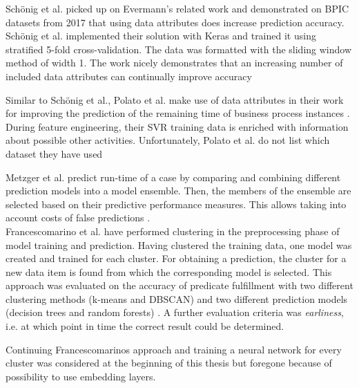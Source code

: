 Schönig et al. \cite{schoenig2018} picked up on Evermann's related work and demonstrated on BPIC datasets from 2017 that using data attributes does increase prediction accuracy. Schönig et al. implemented their solution with Keras and trained it using stratified 5-fold cross-validation. The data was formatted with the sliding window method of width 1. The work nicely demonstrates that an increasing number of included data attributes can continually improve accuracy \cite[p.5]{schoenig2018}

Similar to Schönig et al., Polato et al. make use of data attributes in their work for improving the prediction of the remaining time of business process instances \cite{polato2014}. During feature engineering, their SVR training data is enriched with information about possible other activities. Unfortunately, Polato et al. do not list which dataset they have used\\

Metzger et al. predict run-time of a case by comparing and combining different prediction models into a model ensemble. Then, the members of the ensemble are selected based on their predictive performance measures. This allows taking into account costs of false predictions \cite{metzger2015}.\\

Francescomarino et al. have performed clustering in the preprocessing phase of model training and prediction. Having clustered the training data, one model was created and trained for each cluster. For obtaining a prediction, the cluster for a new data item is found from which the corresponding model is selected.
This approach was evaluated on the accuracy of predicate fulfillment with two different clustering methods (k-means and DBSCAN) and two different prediction models (decision trees and random forests) \cite{francescomarino2015}.
A further evaluation criteria was \textit{earliness}, i.e. at which point in time the correct result could be determined.

Continuing Francescomarinos approach and training a neural network for every cluster was considered at the beginning of this thesis but foregone because of possibility to use embedding layers.\\

